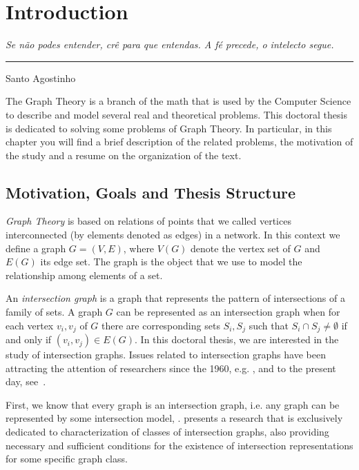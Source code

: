 \chapter{Introduction}

\begin{flushright}
\begin{minipage}[t][0cm][b]{0.47\textwidth}
\emph{Se não podes entender, crê para que entendas. A fé precede, o intelecto segue.}
\end{minipage}

\rule[0cm]{7cm}{0.03cm}%

Santo Agostinho
\end{flushright}

The Graph Theory is a branch of the math that is used by the Computer Science to describe and model several real and theoretical problems.  This doctoral thesis is dedicated to solving some problems of Graph Theory. In particular, in this chapter you will find a brief description of the related problems, the motivation of the study and a resume on the organization of the text.

\section{Motivation, Goals and Thesis Structure}


\emph{Graph Theory} is based on relations of points that we called vertices interconnected (by elements denoted as edges) in a network. In this context we define a graph $G=(V,E)$, where $V(G)$ denote the vertex set of $G$ and $E(G)$ its edge set. The graph is the object that we use to model the relationship among  elements of a set.

An \emph{intersection graph} is a graph that represents the pattern of intersections of a family of sets. A graph $G$ can be represented as an intersection graph when for each vertex $v_i, v_j$ of $G$ there are corresponding sets $S_i, S_j$ such that $S_i \cap S_j \neq \emptyset $ if and only if $(v_i, v_j) \in E(G)$. In this doctoral thesis, we are interested in the study of intersection graphs. Issues related to intersection graphs have been attracting the attention of researchers since the 1960, e.g. \cite{erdos1966representation}, and to the present day, see~\cite{petito2002grafos,jose2018}.

 First, we know that every graph is an intersection graph, i.e. any graph can be represented by some intersection model, \cite{szpilrajn1945translation, erdos1966representation}. \citet{scheinerman1985characterizing} presents a research that is exclusively dedicated to characterization of classes of intersection graphs, also providing necessary and sufficient conditions for the existence of intersection representations for some specific graph class.


